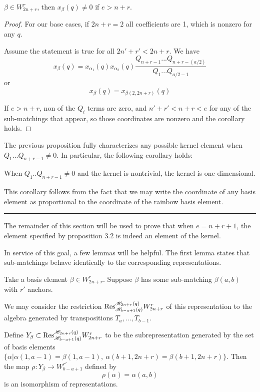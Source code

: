 \documentclass{amsart}
\begin{document}
\vspace{5mm}
\begin{corollary}
	$\beta\in W_{2n+r}^r$, then $x_\beta(q)\not=0$ if $e>n+r$.
\end{corollary}

\begin{proof}
	For our base cases, if $2n+r=2$ all coefficients are 1, which is nonzero for any $q$.
	
	Assume the statement is true for all $2n'+r'<2n+r$. We have $$x_\beta(q)=x_{\alpha_1}(q)x_{\alpha_2}(q)\frac{Q_{n+r-1}...Q_{n+r-(a/2)}}{Q_1...Q_{a/2-1}}$$
	or $$x_\beta(q)=x_{\beta(2,2n+r)}(q)$$
	
	If $e>n+r$, non of the $Q_i$ terms are zero, and $n'+r'<n+r<e$ for any of the sub-matchings that appear, so those coordinates are nonzero and the corollary holds.
	
	
\end{proof}


\vspace{5mm}
The previous proposition fully characterizes any possible kernel element when $Q_1...Q_{n+r-1}\not=0$. In particular, the following corollary holds:

\begin{corollary}
	When $Q_1..Q_{n+r-1}\not=0$ and the kernel is nontrivial, the kernel is one dimensional.
\end{corollary}

This corollary follows from the fact that we may write the coordinate of any basis element as proportional to the coordinate of the rainbow basis element.

\vspace{5mm}
\noindent\rule{16.5cm}{0.4pt}

\vspace{5mm}
The remainder of this section will be used to prove that when $e=n+r+1$, the element specified by proposition 3.2 is indeed an element of the kernel.

In service of this goal, a few lemmas will be helpful. The first lemma states that sub-matchings behave identically to the corresponding representations.

\vspace{5mm}
\begin{lemma}
	Take a basis element $\beta\in W_{2n+r}^r$. Suppose $\beta$ has some sub-matching $\beta(a,b)$ with $r'$ anchors. 
	
	We may consider the restriction $\text{Res}_{\mathscr{H}_{b-a+1}(q)}^{\mathscr{H}_{2n+r}(q)}W_{2n+r}^r$ of this representation to the algebra generated by transpositions $T_a,...,T_{b-1}$. 
	
	Define $Y_\beta\subset \text{Res}_{\mathscr{H}_{b-a+1}(q)}^{\mathscr{H}_{2n+r}(q)}W_{2n+r}^r$ to be the subrepresentation generated by the set of basis elements $\{\alpha| \alpha(1,a-1)=\beta(1,a-1),\ \alpha(b+1,2n+r)=\beta(b+1,2n+r)\}$. Then the map $\rho:Y_\beta\rightarrow W_{b-a+1}^{r'}$ defined by $$\rho(\alpha)=\alpha(a,b)$$ is an isomorphism of representations.
\end{lemma}
\end{document}
